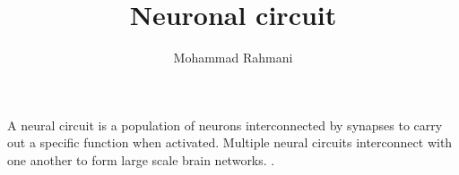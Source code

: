 \documentclass[a4paper]{article}
\title{Neuronal circuit}
\date{}
\author{Mohammad Rahmani}
\begin{document}
    \maketitle
    A neural circuit is a population of neurons interconnected by synapses to carry out a specific function when activated. Multiple neural circuits interconnect with one another to form large scale brain networks. .
\end{document}
